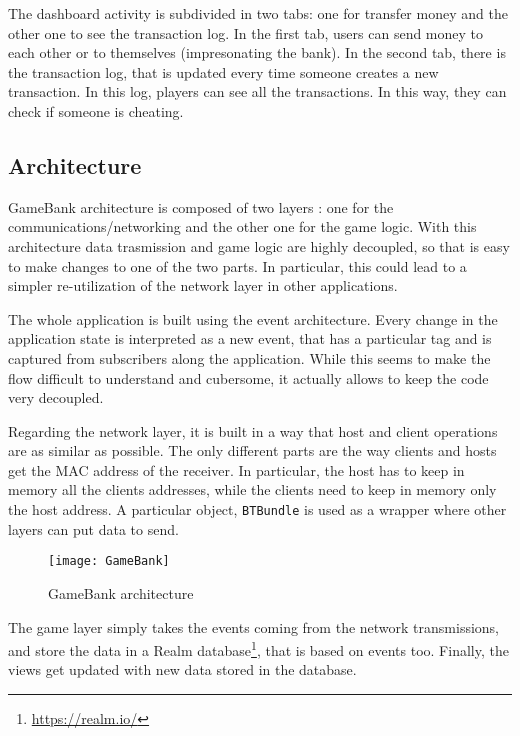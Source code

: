 The dashboard activity is subdivided in two tabs: one for transfer money and 
the other one to see the transaction log. In the first tab, users can send 
money to each other or to themselves (impresonating the bank). In the second 
tab, there is the transaction log, that is updated every time someone creates a 
new transaction. In this log, players can see all the transactions. In this 
way, they can check if someone is cheating. 

\subsection{Architecture}

GameBank architecture is composed of two layers : one 
for the communications/networking and the other one for the game logic. With 
this architecture data trasmission and game logic are highly decoupled, so that 
is easy to make changes to one of the two parts. In particular, this could lead 
to a simpler re-utilization of the network layer in other applications.

The whole application is built using the event architecture. Every change in 
the application state is interpreted as a new event, that has a particular tag 
and is captured from subscribers along the application. While this seems to 
make the flow difficult to understand and cubersome, it actually allows to keep 
the code very decoupled.

Regarding the network layer, it is built in a way that host and client 
operations are as similar as possible. The only different parts are the way 
clients and hosts get the MAC address of the receiver. In particular, the host 
has to keep in memory all the clients addresses, while the clients need to 
keep in memory only the host address. A particular object, \texttt{BTBundle} is 
used as a wrapper where other layers can put data to send.

\begin{figure}[t]
 \centering
 \texttt{[image: GameBank]}
 \caption{GameBank architecture}
 \label{fig:gbArchitecture}
\end{figure}

The game layer simply takes the events coming from the network transmissions, 
and store the data in a Realm database\footnote{\url{https://realm.io/}}, that 
is based on events too. Finally, the views get updated with new data stored in 
the database.

